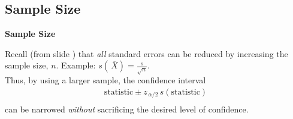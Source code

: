 \documentclass[compress]{beamer}        %
\makeatletter
\newcommand{\tcb}{\textcolor{beamer@blendedblue}}
\makeatother
\begin{document}
\subsection{Sample Size}
\begin{frame}{\bf \tcb{Sample Size}}

Recall (from slide \pageref{confpractice}) that \emph{all} standard errors can be reduced by increasing the sample size, $n$. Example: $s(\,\overline{\!X}) = \frac{s}{\sqrt{n}}$. \\[1.2cm]

Thus, by using a larger sample, the confidence interval\\[-0.0cm]
\begin{align*}
\text{statistic} \pm z_{\,\alpha/2}\,s(\text{statistic})\\[-0.1cm]
\end{align*}
can be narrowed \emph{without} sacrificing the desired level of confidence.



\end{frame}
\end{document}
